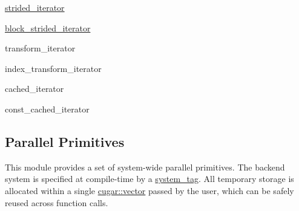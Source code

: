 \begin{DoxyItemize}
\item \hyperlink{structcugar_1_1strided__iterator}{strided\+\_\+iterator}
\item \hyperlink{structcugar_1_1block__strided__iterator}{block\+\_\+strided\+\_\+iterator}
\item transform\+\_\+iterator
\item index\+\_\+transform\+\_\+iterator
\item cached\+\_\+iterator
\item const\+\_\+cached\+\_\+iterator 
\end{DoxyItemize}\hypertarget{primitives_page}{}\subsection{Parallel Primitives}\label{primitives_page}
This module provides a set of system-\/wide parallel primitives. The backend system is specified at compile-\/time by a \hyperlink{group___system_tags}{system\+\_\+tag}. All temporary storage is allocated within a single \hyperlink{structcugar_1_1vector}{cugar\+::vector} passed by the user, which can be safely reused across function calls.


